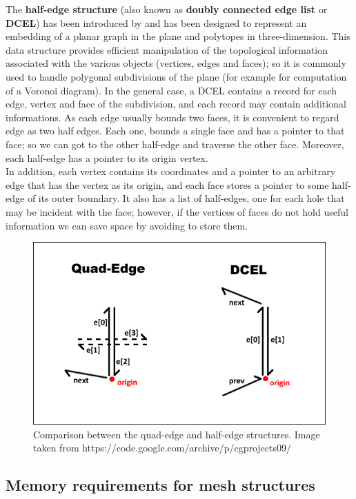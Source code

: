 The \textbf{half-edge structure} (also known as \textbf{doubly connected edge list} or \textbf{DCEL}) has been introduced by \cite{Muller} and has been designed to represent an embedding of a planar graph in the plane and polytopes in three-dimension. This data structure provides efficient manipulation of the topological information associated with the various objects (vertices, edges and faces); so it is commonly used to handle polygonal subdivisions of the plane (for example for computation of a Voronoi diagram). In the general case, a DCEL contains a record for each edge, vertex and face of the subdivision, and each record may contain additional informations. As each edge usually bounds two faces, it is convenient to regard edge as two half edges. Each one, bounds a single face and has a pointer to that face; so we can got to the other half-edge and traverse the other face. Moreover, each half-edge has a pointer to its origin vertex.\\
In addition, each vertex contains its coordinates and a pointer to an arbitrary edge that has the vertex as its origin, and each face stores a pointer to some half-edge of its outer boundary. It also has a list of half-edges, one for each hole that may be incident with the face; however, if the vertices of faces do not hold useful information we can save space by avoiding to store them.

\begin{figure}[htb] %
   \centering
   \includegraphics[width=0.60\linewidth]{images/dcel-quadedge.png}
   \caption[Comparison between the quad-edge and half-edge structures]{Comparison between the quad-edge and half-edge structures. Image taken from https://code.google.com/archive/p/cgprojects09/}
   \label{fig:dcel-quadedge}
\end{figure}

\subsection{Memory requirements for mesh structures}\label{sec14:MemoryReq}


